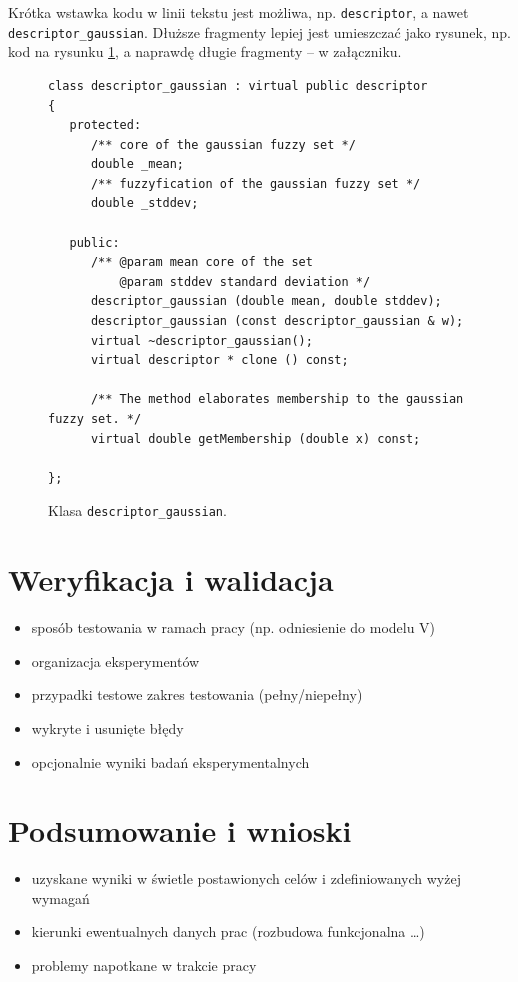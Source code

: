 \documentclass[a4paper,twoside,12pt]{book}
\begin{document}
Krótka wstawka kodu w linii tekstu jest możliwa, np. \lstinline|descriptor|, a nawet \lstinline|descriptor_gaussian|. 
Dłuższe fragmenty lepiej jest umieszczać jako rysunek, np. kod na rysunku \ref{fig:pseudokod}, a naprawdę długie fragmenty – w załączniku.

\begin{figure}
\centering
\begin{lstlisting}
class descriptor_gaussian : virtual public descriptor
{
   protected:
      /** core of the gaussian fuzzy set */
      double _mean;
      /** fuzzyfication of the gaussian fuzzy set */
      double _stddev;
      
   public:
      /** @param mean core of the set
          @param stddev standard deviation */
      descriptor_gaussian (double mean, double stddev);
      descriptor_gaussian (const descriptor_gaussian & w);
      virtual ~descriptor_gaussian();
      virtual descriptor * clone () const;
      
      /** The method elaborates membership to the gaussian fuzzy set. */
      virtual double getMembership (double x) const;
     
};
\end{lstlisting}
\caption{Klasa \lstinline|descriptor_gaussian|.}
\label{fig:pseudokod}
\end{figure}


\chapter{Weryfikacja i walidacja}
\begin{itemize}
\item sposób testowania w ramach pracy (np. odniesienie do modelu V)
\item organizacja eksperymentów
\item przypadki testowe zakres testowania (pełny/niepełny)
\item wykryte i usunięte błędy
\item opcjonalnie wyniki badań eksperymentalnych
\end{itemize}
 


\chapter{Podsumowanie i wnioski}
\begin{itemize}
\item uzyskane wyniki w świetle postawionych celów i zdefiniowanych wyżej wymagań
\item kierunki ewentualnych danych prac (rozbudowa funkcjonalna …)
\item problemy napotkane w trakcie pracy
\end{itemize}
\end{document}

